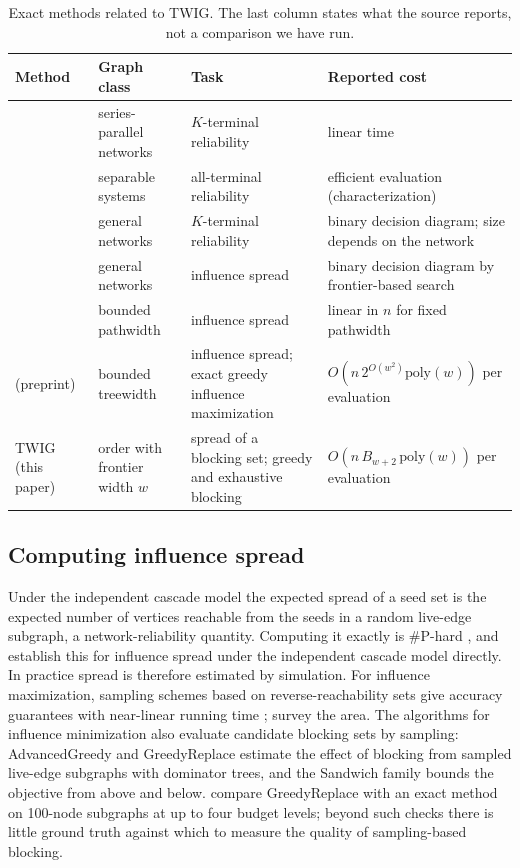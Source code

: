 \documentclass[preprint,11pt]{elsarticle}
\theoremstyle{definition}
\theoremstyle{remark}
\newcommand{\up}{\rule{0pt}{2.6ex}}
\begin{document}
\begin{table}[h]
\centering
\caption{Exact methods related to TWIG. The last column states what the source reports, not a comparison we have run.}\label{tab:related-exact}
\small
\begin{tabular}{@{}>{\raggedright\arraybackslash}p{}>{\raggedright\arraybackslash}p{}>{\raggedright\arraybackslash}p{}>{\raggedright\arraybackslash}p{}@{}}
\hline
\up Method & Graph class & Task & Reported cost \\
\hline
\up \citet{satyanarayana1985} & series-parallel networks & $K$-terminal reliability & linear time \\
\citet{cancela2021} & separable systems & all-terminal reliability & efficient evaluation (characterization) \\
\citet{hardy2007} & general networks & $K$-terminal reliability & binary decision diagram; size depends on the network \\
\citet{maehara2017} & general networks & influence spread & binary decision diagram by frontier-based search \\
\citet{nakamura2026} & bounded pathwidth & influence spread & linear in $n$ for fixed pathwidth \\
\citet{pozar2026} (preprint) & bounded treewidth & influence spread; exact greedy influence maximization & $O(n\,2^{O(w^2)}\mathrm{poly}(w))$ per evaluation \\
TWIG (this paper) & order with frontier width $w$ & spread of a blocking set; greedy and exhaustive blocking & $O(n\,B_{w+2}\,\mathrm{poly}(w))$ per evaluation \\
\hline
\end{tabular}
\end{table}

\subsection{Computing influence spread}

Under the independent cascade model the expected spread of a seed set is the expected number of vertices reachable from the seeds in a random live-edge subgraph, a network-reliability quantity. Computing it exactly is \#P-hard \citep{valiant1979,provan1983}, and \citet{chen2010} establish this for influence spread under the independent cascade model directly. In practice spread is therefore estimated by simulation. For influence maximization, sampling schemes based on reverse-reachability sets give accuracy guarantees with near-linear running time \citep{borgs2014,tang2014}; \citet{li2018} survey the area. The algorithms for influence minimization also evaluate candidate blocking sets by sampling: AdvancedGreedy and GreedyReplace \citep{xie2023,xie2024} estimate the effect of blocking from sampled live-edge subgraphs with dominator trees, and the Sandwich family \citep{wang2024sandwich} bounds the objective from above and below. \citet{xie2024} compare GreedyReplace with an exact method on 100-node subgraphs at up to four budget levels; beyond such checks there is little ground truth against which to measure the quality of sampling-based blocking.
\end{document}

